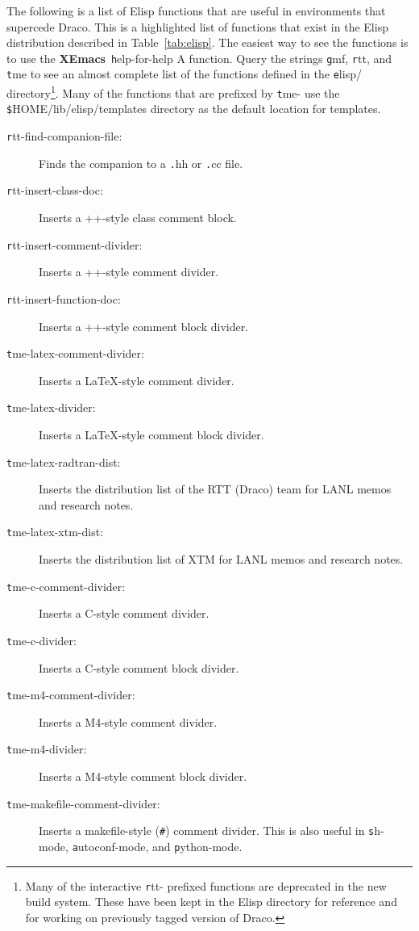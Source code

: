 \documentclass[11pt]{nmemo}
\newcommand{\comp}[1]{{\normalfont\texttt#1}}
\newcommand{\draco}{{\normalfont\sffamily Draco}}
\newcommand{\xemacs}{{\normalfont\bfseries XEmacs}}
\begin{document}
The following is a list of Elisp functions that are useful in
environments that supercede \draco.  This is a highlighted list of
functions that exist in the Elisp distribution described in
Table~\ref{tab:elisp}.  The easiest way to see the functions is to use
the \xemacs\ \comp{help-for-help A} function.  Query the strings
\comp{gmf}, \comp{rtt}, and \comp{tme} to see an almost complete list
of the functions defined in the \comp{elisp/} directory\footnote{Many
  of the interactive \comp{rtt-} prefixed functions are deprecated in
  the new build system.  These have been kept in the Elisp directory
  for reference and for working on previously tagged version of
  \draco.}.  Many of the functions that are prefixed by \comp{tme-}
use the \comp{\$HOME/lib/elisp/templates} directory as the default
location for templates.
\begin{description}
\item[\comp{rtt-find-companion-file}:] Finds the companion to a
  \comp{.hh} or \comp{.cc} file.
\item[\comp{rtt-insert-class-doc}:] Inserts a \C++-style class comment 
  block.
\item[\comp{rtt-insert-comment-divider}:] Inserts a \C++-style comment 
  divider.
\item[\comp{rtt-insert-function-doc}:] Inserts a \C++-style comment
  block divider.
\item[\comp{tme-latex-comment-divider}:] Inserts a \LaTeX-style comment
  divider.
\item[\comp{tme-latex-divider}:] Inserts a \LaTeX-style comment block 
  divider.
\item[\comp{tme-latex-radtran-dist}:] Inserts the distribution list of 
  the RTT (\draco) team for LANL memos and research notes.
\item[\comp{tme-latex-xtm-dist}:] Inserts the distribution list of XTM 
  for LANL memos and research notes.
\item[\comp{tme-c-comment-divider}:] Inserts a C-style comment
  divider.
\item[\comp{tme-c-divider}:] Inserts a C-style comment block divider.
\item[\comp{tme-m4-comment-divider}:] Inserts a M4-style comment
  divider.
\item[\comp{tme-m4-divider}:] Inserts a M4-style comment block
  divider.
\item[\comp{tme-makefile-comment-divider}:] Inserts a makefile-style
  (\comp{\#}) comment divider.  This is also useful in \comp{sh-mode},
  \comp{autoconf-mode}, and \comp{python-mode}.

\end{description}
\end{document}
